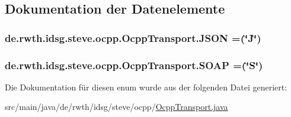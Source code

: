 \subsection{Dokumentation der Datenelemente}
\hypertarget{enumde_1_1rwth_1_1idsg_1_1steve_1_1ocpp_1_1_ocpp_transport_aa9ac4184d327d7868285a13790f45cdc}{
\subsubsection[{J\-S\-O\-N}]{\setlength{\rightskip}{0pt plus 5cm}de.\-rwth.\-idsg.\-steve.\-ocpp.\-Ocpp\-Transport.\-J\-S\-O\-N =(\char`\"{}J\char`\"{})}}\label{enumde_1_1rwth_1_1idsg_1_1steve_1_1ocpp_1_1_ocpp_transport_aa9ac4184d327d7868285a13790f45cdc}
\hypertarget{enumde_1_1rwth_1_1idsg_1_1steve_1_1ocpp_1_1_ocpp_transport_ae1fa7bdd519c49e7c5d175538ec2eb47}{
\subsubsection[{S\-O\-A\-P}]{\setlength{\rightskip}{0pt plus 5cm}de.\-rwth.\-idsg.\-steve.\-ocpp.\-Ocpp\-Transport.\-S\-O\-A\-P =(\char`\"{}S\char`\"{})}}\label{enumde_1_1rwth_1_1idsg_1_1steve_1_1ocpp_1_1_ocpp_transport_ae1fa7bdd519c49e7c5d175538ec2eb47}


Die Dokumentation für diesen enum wurde aus der folgenden Datei generiert\-:\begin{DoxyCompactItemize}
\item 
src/main/java/de/rwth/idsg/steve/ocpp/\hyperlink{_ocpp_transport_8java}{Ocpp\-Transport.\-java}\end{DoxyCompactItemize}
